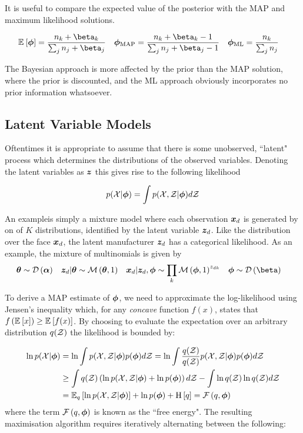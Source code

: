 It is useful to compare the expected value of the posterior with the MAP and maximum likelihood solutions.

\begin{align}
\ex{\param}{}  &= \frac{n_k + \beta_k}{\sum_j n_j + \beta_j} &
\map{\param} &= \frac{n_k + \beta_k - 1}{\sum_j n_j + \beta_j - 1} &
\ml{\param}  &= \frac{n_k}{\sum_j n_j}
\end{align}

The Bayesian approach is more affected by the prior than the MAP solution, where the prior is discounted, and the ML approach obviously incorporates no prior information whatsoever.
 
\subsection{Latent Variable Models}
Oftentimes it is appropriate to assume that there is some unobserved, ``latent" process which determines the distributions of the observed variables. Denoting the latent variables as $\bm z$ this gives rise to the following likelihood

\begin{align}
p({ \mathcal{X} }|{ \bm \phi }) = \int p({ \mathcal{X} }, { \mathcal{Z} }|{ \bm \phi }) d{ \mathcal{Z} }
\end{align}

An exampleis simply a mixture model where each observation ${ \bm x_d }$ is generated by on of $K$ distributions, identified by the latent variable $\bm z_d$. Like the distribution over the face $\bm x_d$, the latent manufacturer $\bm z_d$ has a categorical likelihood. As an example, the mixture of multinomials is given by\cite{Nigam2000}
\begin{align}
\vv{\theta} & \sim \dir{\vv{\alpha}} &
\vv{z}_d|\vv{\theta} & \sim \muln{\vv{\theta}}{1} & 
\vv{x}_d|\vv{z}_d, \param & \sim \prod_k \muln{\param}{1}^{z_{dk}} & 
\param & \sim \dir{\vv{\beta}}
\end{align}

To derive a MAP estimate of ${ \bm \phi }$, we need to approximate the log-likelihood using Jensen's inequality which, for any \emph{concave} function $f(x)$, states that $f\left(\mathbb{E}_{ {  } }\left[ x \right]\right) \geq \mathbb{E}_{ {  } }\left[ f(x) \right]$. By choosing to evaluate the expectation over an arbitrary distribution $q({ \mathcal{Z} })$ the likelihood is bounded by:

\begin{align}
\ln p({ \mathcal{X} }|{ \bm \phi }) & = \ln \int { p( { \mathcal{X} } ,  { \mathcal{Z} } |  {  \bm \phi  } ) } p({ \bm \phi }) d{ \mathcal{Z} } 
 = \ln \int \frac{q({ \mathcal{Z} })}{q({ \mathcal{Z} })} { p({ \mathcal{X} }, { \mathcal{Z} } | { \bm \phi }) } p({ \bm \phi }) d{ \mathcal{Z} } \\
& \geq \int  q({ \mathcal{Z} }) \left({ \ln { p( { \mathcal{X} } ,  { \mathcal{Z} } |  {  \bm \phi  } ) } } + \ln p({ \bm \phi })\right) d{ \mathcal{Z} }
  -     \int \ln q({ \mathcal{Z} }) \ln q({ \mathcal{Z} }) d{ \mathcal{Z} } \\
& = { \mathbb{E}_{ { {q} } }\left[ { \ln { p( { \mathcal{X} } ,  { \mathcal{Z} } |  {  \bm \phi  } ) } } \right] } + \ln p({ \bm \phi }) + \text{H} \left[ q \right] = { \mathcal{F}\left( {q, { \bm \phi }} \right) }
\end{align}
where the term ${ \mathcal{F}\left( {q, { \bm \phi }} \right) }$ is known as the ``free energy". The resulting maximisation algorithm requires iteratively alternating between the following:


